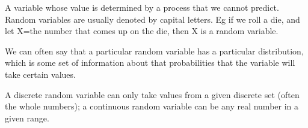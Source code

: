 A variable whose value is determined by a process that we cannot predict.
Random variables are usually denoted by capital letters. Eg if
we roll a die, and let X=the number that comes up on the die, then
X is a random variable.
\par
We can often say that a particular random variable has a particular
distribution, which is some set of information about that probabilities 
that the variable will take certain values.
\par
A discrete random variable can only take values from a given discrete
set (often the whole numbers); a continuous random variable can be
any real number in a given range.